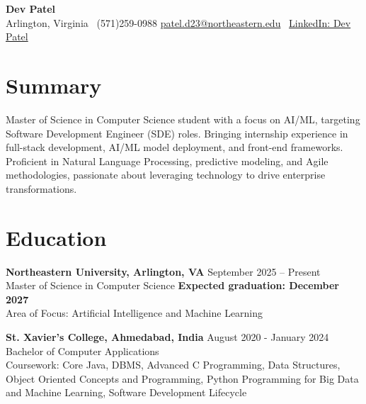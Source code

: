 \documentclass[a4paper,10pt]{article}
\begin{document}
\begin{center}
\vspace{-3mm}
    \fontsize{16}{18}\selectfont \textbf{Dev Patel} \\
    \vspace{0mm}
    \normalsize Arlington, Virginia \textbar\ (571)259-0988  \textbar       \href{mailto:patel.d23@northeastern.edu}{patel.d23@northeastern.edu} \textbar\ \href{https://www.linkedin.com/in/devxpatel//}{LinkedIn: Dev Patel} \\
\end{center}



\section*{Summary}
Master of Science in Computer Science student with a focus on AI/ML, targeting Software Development Engineer (SDE) roles. Bringing internship experience in full-stack development, AI/ML model deployment, and front-end frameworks. Proficient in Natural Language Processing, predictive modeling, and Agile methodologies, passionate about leveraging technology to drive enterprise transformations.
 
\vspace{ 0 mm}
\section*{Education}
\textbf{Northeastern University, Arlington, VA} \hfill September 2025 -- Present\\
Master of Science in Computer Science \hfill \textbf{Expected graduation: December 2027} \\
Area of Focus: Artificial Intelligence and Machine Learning

\vspace{1 mm} %
\textbf{St. Xavier's College, Ahmedabad, India} \hfill August 2020 - January 2024 \\
Bachelor of Computer Applications\\
Coursework: Core Java, DBMS, Advanced C Programming, Data Structures, Object Oriented Concepts and Programming, Python Programming for Big Data and Machine Learning, Software Development Lifecycle
\end{document}
